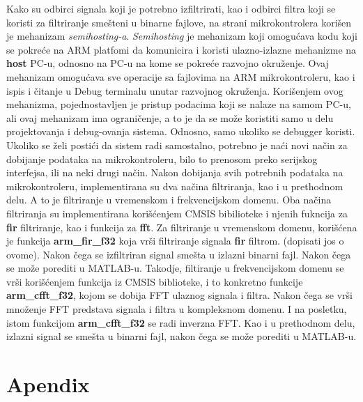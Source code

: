 \documentclass[a4paper,12pt, projekat]{etf}
\begin{document}
		Kako su odbirci signala koji je potrebno izfiltrirati, kao i odbirci filtra koji se koristi za filtriranje 
		sme\v{s}teni u binarne fajlove, na strani mikrokontrolera kori\v{s}en je mehanizam \textit{semihosting-a}.
		\textit{Semihosting} je mehanizam koji omogu\'{c}ava kodu koji se pokre\'{c}e na ARM platfomi da komunicira 
		i koristi ulazno-izlazne mehanizme na \textbf{host} PC-u, odnosno na PC-u na kome se pokre\'{c}e razvojno 
		okru\v{z}enje. Ovaj mehanizam omogu\'{c}ava sve operacije sa fajlovima na ARM mikrokontroleru, kao i ispis 
		i \v{c}itanje u Debug terminalu unutar razvojnog okru\v{z}enja. Kori\v{s}enjem ovog mehanizma, pojednostavljen 
		je pristup podacima koji se nalaze na samom PC-u, ali ovaj mehanizam ima ograni\v{c}enje, a to je da se mo\v{z}e 
		koristiti samo u delu projektovanja i debug-ovanja sistema. Odnosno, samo ukoliko se debugger koristi. Ukoliko 
		se \v{z}eli posti\'{c}i da sistem radi samostalno, potrebno je na\'{c}i novi na\v{c}in za dobijanje podataka na 
		mikrokontroleru, bilo to prenosom preko serijskog interfejsa, ili na neki drugi na\v{c}in. 
		Nakon dobijanja svih potrebnih podataka na mikrokontroleru, implementirana su dva na\v{c}ina filtriranja, kao i 
		u prethodnom delu. A to je filtriranje u vremenskom i frekvencijskom domenu. Oba na\v{c}ina filtriranja su 
		implementirana kori\v{s}\'{c}enjem CMSIS bibilioteke i njenih fukncija za \textbf{fir} filtriranje, kao i 
		funkcija za \textbf{fft}.
		Za filtriranje u vremenskom domenu, kori\v{s}\'{c}ena je funkcija \textbf{arm_fir_f32} koja vr\v{s}i filtriranje 
		signala \textbf{fir} filtrom. (dopisati jos o ovome). Nakon \v{c}ega se izfiltriran signal sme\v{s}ta u izlazni 
		binarni fajl. Nakon \v{c}ega se mo\v{z}e porediti u MATLAB-u.
		Takodje, filtiranje u frekvencijskom domenu se vr\v{s}i kori\v{s}\'{c}enjem funkcija iz CMSIS biblioteke, i to 
		konkretno funkcije \textbf{arm_cfft_f32}, kojom se dobija FFT ulaznog signala i filtra. Nakon \v{c}ega se vr\v{s}i 
		mno\v{z}enje FFT predstava signala i filtra u kompleksnom domenu. I na posletku, istom funkcijom \textbf{arm_cfft_f32} 
		se radi inverzna FFT. Kao i u prethodnom delu, izlazni signal se sme\v{s}ta u binarni fajl, nakon \v{c}ega se mo\v{z}e 
		porediti u MATLAB-u.
		

        \chapter{Apendix}

\begin{verbatim}


\end{verbatim}
\end{document}
